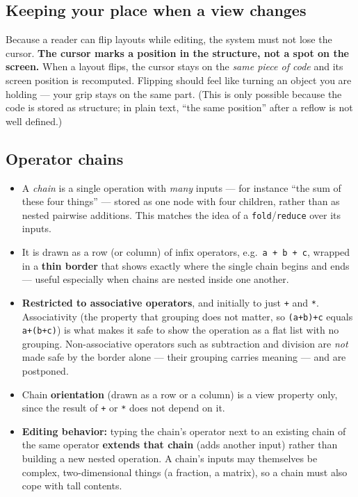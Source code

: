 \documentclass[11pt]{article}
\newcommand{\req}[1]{\textbf{\color{accent}#1}}
\newcommand{\term}[1]{\emph{#1}}
\begin{document}
\subsection{Keeping your place when a view changes}
Because a reader can flip layouts while editing, the system must not lose the cursor. \req{The cursor marks a position in the structure, not a spot on the screen.} When a layout flips, the cursor stays on the \emph{same piece of code} and its screen position is recomputed. Flipping should feel like turning an object you are holding --- your grip stays on the same part. (This is only possible because the code is stored as structure; in plain text, ``the same position'' after a reflow is not well defined.)

\subsection{Operator chains}
\begin{itemize}[leftmargin=1.4em,itemsep=3pt]
  \item A \term{chain} is a single operation with \emph{many} inputs --- for instance ``the sum of these four things'' --- stored as one node with four children, rather than as nested pairwise additions. This matches the idea of a \texttt{fold}/\texttt{reduce} over its inputs.
  \item It is drawn as a row (or column) of infix operators, e.g.\ \texttt{a + b + c}, wrapped in a \req{thin border} that shows exactly where the single chain begins and ends --- useful especially when chains are nested inside one another.
  \item \req{Restricted to associative operators}, and initially to just \texttt{+} and \texttt{*}. Associativity (the property that grouping does not matter, so \texttt{(a+b)+c} equals \texttt{a+(b+c)}) is what makes it safe to show the operation as a flat list with no grouping. Non-associative operators such as subtraction and division are \emph{not} made safe by the border alone --- their grouping carries meaning --- and are postponed.
  \item Chain \req{orientation} (drawn as a row or a column) is a view property only, since the result of \texttt{+} or \texttt{*} does not depend on it.
  \item \textbf{Editing behavior:} typing the chain's operator next to an existing chain of the same operator \req{extends that chain} (adds another input) rather than building a new nested operation. A chain's inputs may themselves be complex, two-dimensional things (a fraction, a matrix), so a chain must also cope with tall contents.
\end{itemize}
\end{document}
